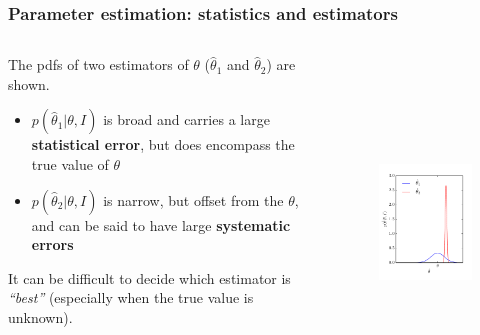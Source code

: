 \begin{frame}

\frametitle{Parameter estimation: statistics and estimators}
\label{parameterestimation:statisticsandestimators}

\begin{columns}
\begin{column}{0.55\textwidth}

The pdfs of two estimators of $\theta$ ($\hat{\theta}_1$ and $\hat{\theta}_2$) are shown.

\begin{itemize}
\item $p(\hat{\theta}_1|\theta,I)$ is broad and carries a large \textbf{statistical error}, but does encompass the true value of $\theta$

\item $p(\hat{\theta}_2|\theta,I)$ is narrow, but offset from the $\theta$, and can be said to have large \textbf{systematic errors}

\end{itemize}

It can be difficult to decide which estimator is \emph{``best''} (especially when the true value is unknown).

\end{column}
\begin{column}{0.45\textwidth}

\begin{figure}[htbp]
\centering
\includegraphics[keepaspectratio,width=\textwidth,height=250pt]{figures/estimator.pdf}
\label{estimator}
\end{figure}

\end{column}
\end{columns}

\end{frame}

